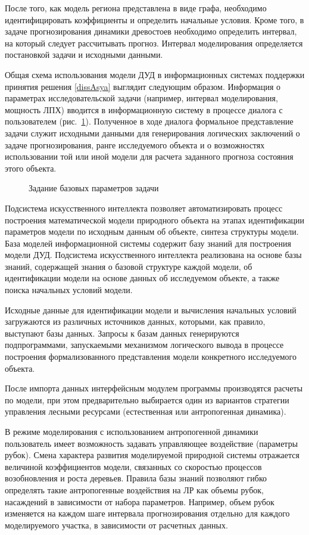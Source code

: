 После того, как модель региона представлена в виде графа, необходимо идентифицировать коэффициенты и определить начальные условия. Кроме того, в задаче прогнозирования динамики древостоев необходимо определить интервал, на который следует рассчитывать прогноз. Интервал моделирования определяется постановкой задачи и исходными данными.

Общая схема использования модели ДУД в информационных системах поддержки принятия решения \ref{dissAsya} выглядит следующим образом. Информация о параметрах исследовательской задачи (например, интервал моделирования, мощность ЛПХ) вводится в информационную систему в процессе диалога с пользователем (рис.~\ref{pic:basic_task_params}). Полученное в ходе диалога формальное представление задачи служит исходными данными для генерирования логических заключений о задаче прогнозирования, ранге исследуемого объекта и о возможностях использовании той или иной модели для расчета заданного прогноза состояния этого объекта.

\begin{figure}
\caption{Задание базовых параметров задачи}\label{pic:basic_task_params}
\end{figure}

Подсистема искусственного интеллекта позволяет автоматизировать процесс построения математической модели природного объекта на этапах идентификации параметров модели по исходным данным об объекте, синтеза структуры модели. База моделей информационной системы содержит базу знаний для построения модели ДУД. Подсистема искусственного интеллекта реализована на основе базы знаний, содержащей знания о базовой структуре каждой модели, об идентификации модели на основе данных об исследуемом объекте, а также поиска начальных условий модели.

Исходные данные для идентификации модели и вычисления начальных условий загружаются из различных источников данных, которыми, как правило, выступают базы данных. Запросы к базам данных генерируются подпрограммами, запускаемыми механизмом логического вывода в процессе построения формализованного представления модели конкретного исследуемого объекта.

После импорта данных интерфейсным модулем программы производятся расчеты по модели, при этом предварительно выбирается один из вариантов стратегии управления лесными ресурсами (естественная или антропогенная динамика).

В режиме моделирования с использованием антропогенной динамики пользователь имеет возможность задавать управляющее воздействие (параметры рубок). Смена характера развития моделируемой природной системы отражается величиной коэффициентов модели, связанных со скоростью процессов возобновления и роста деревьев. Правила базы знаний позволяют гибко определять такие антропогенные воздействия на ЛР как объемы рубок, насаждений в зависимости от набора параметров. Например, объем рубок изменяется на каждом шаге интервала прогнозирования отдельно для каждого моделируемого участка, в зависимости от расчетных данных.

